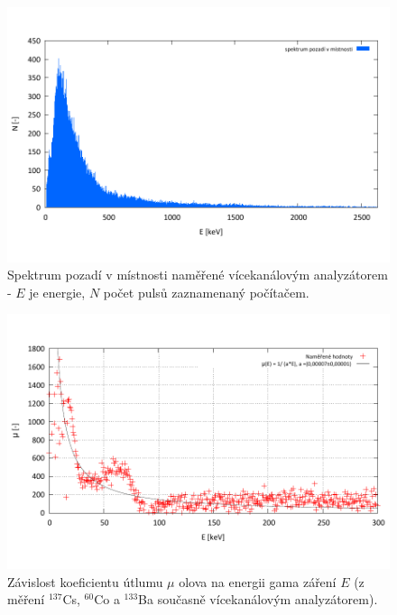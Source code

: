 \documentclass[english]{article}
\begin{document}
	\begin{figure}[h!]
	\begin{center}
	    \vspace*{-1cm}
		\includegraphics[width=\linewidth]{../gnuplot/solo/background.pdf}
	    \vspace*{-2cm}
		\caption{Spektrum pozadí v místnosti naměřené vícekanálovým analyzátorem - $E$ je energie, $N$ počet pulsů zaznamenaný počítačem.}
		\label{fig:g_pozadi_vice}
	\end{center}
	\end{figure}	

	\begin{figure}[h!]
	\begin{center}
	    \vspace*{-1cm}
		\includegraphics[width=\linewidth]{../gnuplot/BaCoCsandPb.pdf}
	    \vspace*{-2cm}
		\caption{Závislost koeficientu útlumu $\mu$ olova na energii gama záření $E$ (z měření $^{137}$Cs, $^{60}$Co a $^{133}$Ba současně vícekanálovým analyzátorem).}
		\label{fig:g_BaCoCsPb}
	\end{center}
	\end{figure}	
	
\end{document}

